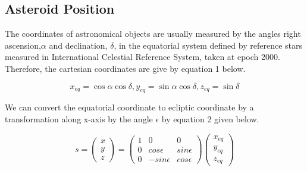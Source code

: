 \documentclass[letterpaper,12pt]{article}
\begin{document}
\subsection{Asteroid Position}
The coordinates of astronomical objects are usually measured by the angles right ascension,\begin{math}\alpha \end{math} and declination, \begin{math} \delta \end{math}, in the equatorial system defined by reference stars measured in International Celestial Reference System, taken at epoch 2000. Therefore, the cartesian coordinates are give by equation 1 below.

\begin{equation}
x_{eq}=\cos\alpha \cos\delta, 
y_{eq}=\sin\alpha \cos\delta ,  
z_{eq}=\sin\delta
\end{equation}

We can convert the equatorial coordinate to ecliptic coordinate by a transformation along x-axis by the angle \begin{math} \epsilon \end{math} by equation 2 given below.

\begin{equation}
s=
\begin{pmatrix}
  x \\
  y \\
  z
 \end{pmatrix} 
  =
\begin{pmatrix}
1 & 0 & 0 \\ 
 0 & cos\epsilon & sin\epsilon\\ 
 0 & -sin\epsilon & cos\epsilon
\end{pmatrix}
\begin{pmatrix}
  x_{eq} \\
  y_{eq} \\
  z_{eq}
\end{pmatrix} 
\end{equation}
\end{document}
